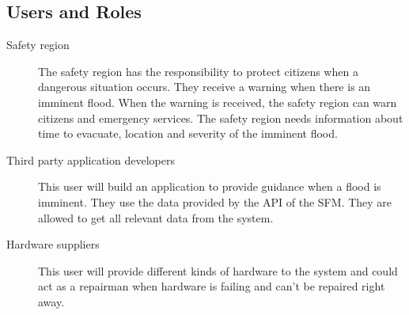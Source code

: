 \subsection{Users and Roles}
\begin{description}
	\item[Safety region] The safety region has the responsibility to protect citizens when a dangerous situation occurs. They receive a warning when there is an imminent flood. When the warning is received, the safety region can warn citizens and emergency services. The safety region needs information about time to evacuate, location and severity of the imminent flood.
	\item[Third party application developers] This user will build an application to provide guidance when a flood is imminent. They use the data provided by the \gls{API} of the \gls{SFM}. They are allowed to get all relevant data from the system.
	\item[Hardware suppliers] This user will provide different kinds of hardware to the system and could act as a repairman when hardware is failing and can't be repaired right away.
\end{description} 

